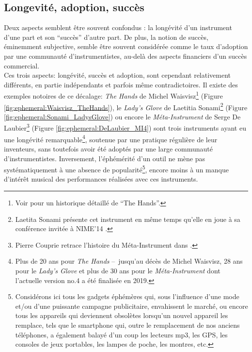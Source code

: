 	
\subsection{Longevité, adoption, succès}

\noindent Deux aspects semblent être souvent confondus : la longévité d'un instrument d'une part et son ``succès'' d'autre part. De plus, la notion de succès, éminemment subjective, semble être souvent considérée comme le taux d'adoption par une communauté d'instrumentistes, au-delà des aspects financiers d'un succès commercial.\\
\indent Ces trois aspects: longévité, succès et adoption, sont cependant relativement différents, en partie indépendants et parfois même contradictoires. Il existe des exemples notoires de ce décalage: \textit{The Hands} de Michel Waisvisz\footnote{Voir \cite{torre_hands:_2016} pour un historique détaillé de ``The Hands''.} (Figure \ref{fig:ephemeral:Waisvisz_TheHands}), le \textit{Lady's Glove} de Laetitia Sonami\footnote{Laetita Sonami présente cet instrument en même temps qu'elle en joue à sa conférence invitée à NIME'14 \cite{sonami_dreams_2014}.} (Figure \ref{fig:ephemeral:Sonami_LadysGlove}) ou encore le \textit{Méta-Instrument} de Serge De Laubier\footnote{Pierre Couprie retrace l'histoire du Méta-Instrument dans \cite{couprie_meta-instrument:_2018}.} (Figure \ref{fig:ephemeral:DeLaubier_MI4}) sont trois instruments ayant eu une longévité remarquable\footnote{Plus de 20 ans pour \textit{The Hands} --~jusqu'au décès de Michel Waisvisz, 28 ans pour le \textit{Lady's Glove} et plus de 30 ans pour le \textit{Méta-Instrument} dont l'actuelle version no.4 a été finalisée en 2019.}, soutenue par une pratique régulière de leur inventeurs, sans toutefois avoir été adoptés par une large communauté d'instrumentistes. Inversement, l'éphémérité d'un outil ne mène pas systématiquement à une absence de popularité\footnote{Considérons ici tous les gadgets éphémères qui, sous l'influence d'une mode et/ou d'une puissante campagne publicitaire, envahissent le marché, ou encore tous les appareils qui deviennent obsolètes lorsqu'un nouvel appareil les remplace, tels que le smartphone qui, outre le remplacement de nos anciens téléphones, a également balayé d'un coup les lecteurs mp3, les GPS, les consoles de jeux portables, les lampes de poche, les montres, etc.}, encore moins à un manque d'intérêt musical des performances réalisées avec ces instruments.\\

